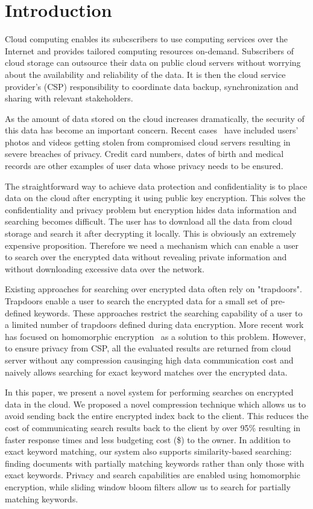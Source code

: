 \section{Introduction}

Cloud computing enables its subcscribers to use computing services over the 
Internet and provides tailored computing resources on-demand. 
Subscribers of cloud storage can outsource their data on public cloud servers
without worrying about the availability and
reliability of the data. It is then the cloud service provider's (CSP) 
responsibility to coordinate data backup, synchronization and sharing
with relevant stakeholders. 

As the amount of data stored on the cloud increases dramatically, the security 
of this data has become an important concern. Recent cases~\cite{top_threats}
have included users' photos and videos getting stolen from compromised cloud servers resulting in
severe breaches of privacy. Credit card numbers, dates of birth and medical
records are other examples of user data whose privacy needs to be ensured.

The straightforward way to achieve data protection and confidentiality is to
place data on the cloud after encrypting it using public key encryption.
This solves the confidentiality and privacy problem
but encryption hides data information and searching becomes difficult. The user
has to download all the data from cloud storage and search it after decrypting it locally. This is
obviously an extremely expensive proposition. Therefore we need a mechanism 
which can enable a user to search over the encrypted data without revealing 
private information and without downloading excessive data over the network.

Existing approaches for searching over encrypted data often rely on
"trapdoors". Trapdoors enable a user to search the encrypted data for a small 
set of pre-defined keywords. These approaches restrict the searching
capability of a user to a limited number of trapdoors defined during data 
encryption. More recent work has focused on homomorphic encryption~\cite{craig} as a solution
to this problem. However, to ensure privacy from CSP, all the evaluated results
are returned from cloud server without any compression causinging high data
communication cost and naively allows searching for exact keyword matches over the encrypted data.

In this paper, we present a novel system for performing searches on encrypted 
data in the cloud. We proposed a novel compression technique which allows us to
avoid sending back the entire encrypted index back to the client. This reduces the cost of
communicating search results back to the client by over 95\% resulting in 
faster response times and less budgeting cost (\$) to the owner. In addition to exact keyword matching, our system also
supports similarity-based searching: finding documents with partially matching 
keywords rather than only those with exact keywords. Privacy and search 
capabilities are enabled using homomorphic encryption, while sliding window 
bloom filters allow us to search for partially matching keywords. 

